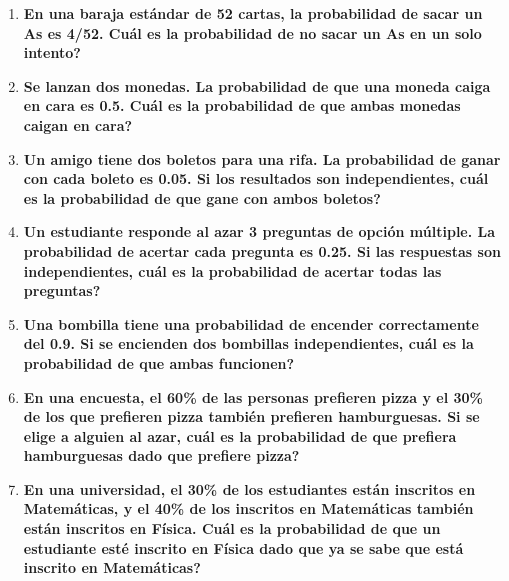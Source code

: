 \documentclass[12pt]{article}
\begin{document}
\begin{enumerate}[label=\textbf{\arabic*.}]
        \item \textbf{En una baraja estándar de 52 cartas, la probabilidad de sacar un As es 4/52.
        \textquestiondown Cuál es la probabilidad de no sacar un As en un solo intento?}

        \item \textbf{Se lanzan dos monedas. La probabilidad de que una moneda caiga en cara es
        0.5. \textquestiondown Cuál es la probabilidad de que ambas monedas caigan en cara?}
        
        \item \textbf{Un amigo tiene dos boletos para una rifa. La probabilidad de ganar con cada
        boleto es 0.05. Si los resultados son independientes, \textquestiondown cuál es la probabilidad de
        que gane con ambos boletos?}
        
        \item \textbf{Un estudiante responde al azar 3 preguntas de opción múltiple. La probabilidad
        de acertar cada pregunta es 0.25. Si las respuestas son independientes, \textquestiondown cuál es
        la probabilidad de acertar todas las preguntas?}
        
        \item \textbf{Una bombilla tiene una probabilidad de encender correctamente del 0.9. Si se
        encienden dos bombillas independientes, \textquestiondown cuál es la probabilidad de que ambas
        funcionen?}
        
        \item \textbf{En una encuesta, el 60\% de las personas prefieren pizza y el 30\% de los que
        prefieren pizza también prefieren hamburguesas. Si se elige a alguien al azar,
        \textquestiondown cuál es la probabilidad de que prefiera hamburguesas dado que prefiere pizza?}
        
        \item \textbf{En una universidad, el 30\% de los estudiantes están inscritos en Matemáticas, y
        el 40\% de los inscritos en Matemáticas también están inscritos en Física. \textquestiondown Cuál
        es la probabilidad de que un estudiante esté inscrito en Física dado que ya se
        sabe que está inscrito en Matemáticas?}

    \end{enumerate}
\end{document}
